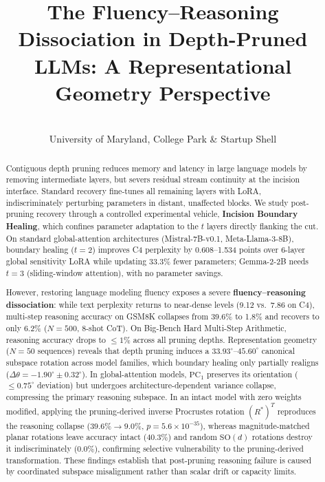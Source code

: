 \documentclass[pmlr,onecolumn]{jmlr}
\title[The Fluency--Reasoning Dissociation in Depth-Pruned LLMs]{The Fluency--Reasoning Dissociation in Depth-Pruned LLMs: A Representational Geometry Perspective}
\author[Kapoor]{\Name{Saksham Kapoor} \Email{sakshamk@terpmail.umd.edu}\\
\addr University of Maryland, College Park \& Startup Shell}
\begin{document}
\raggedbottom

\maketitle

\begin{abstract}
Contiguous depth pruning reduces memory and latency in large language models by removing intermediate layers, but severs residual stream continuity at the incision interface. Standard recovery fine-tunes all remaining layers with LoRA, indiscriminately perturbing parameters in distant, unaffected blocks. We study post-pruning recovery through a controlled experimental vehicle, \textbf{Incision Boundary Healing}, which confines parameter adaptation to the $t$ layers directly flanking the cut. On standard global-attention architectures (Mistral-7B-v0.1, Meta-Llama-3-8B), boundary healing ($t=2$) improves C4 perplexity by 0.608--1.534 points over 6-layer global sensitivity LoRA while updating 33.3\% fewer parameters; Gemma-2-2B needs $t=3$ (sliding-window attention), with no parameter savings.

However, restoring language modeling fluency exposes a severe \textbf{fluency--reasoning dissociation}: while text perplexity returns to near-dense levels (9.12 vs.\ 7.86 on C4), multi-step reasoning accuracy on GSM8K collapses from 39.6\% to 1.8\% and recovers to only 6.2\% ($N=500$, 8-shot CoT). On Big-Bench Hard Multi-Step Arithmetic, reasoning accuracy drops to $\le 1\%$ across all pruning depths. Representation geometry ($N=50$ sequences) reveals that depth pruning induces a $33.93^\circ$--$45.60^\circ$ canonical subspace rotation across model families, which boundary healing only partially realigns ($\Delta\theta = -1.90^\circ \pm 0.32^\circ$). In global-attention models, $\mathrm{PC}_1$ preserves its orientation ($\le 0.75^\circ$ deviation) but undergoes architecture-dependent variance collapse, compressing the primary reasoning subspace. In an intact model with zero weights modified, applying the pruning-derived inverse Procrustes rotation $(R^*)^T$ reproduces the reasoning collapse ($39.6\% \to 9.0\%$, $p = 5.6 \times 10^{-35}$), whereas magnitude-matched planar rotations leave accuracy intact ($40.3\%$) and random $\text{SO}(d)$ rotations destroy it indiscriminately ($0.0\%$), confirming selective vulnerability to the pruning-derived transformation. These findings establish that post-pruning reasoning failure is caused by coordinated subspace misalignment rather than scalar drift or capacity limits.
\end{abstract}
\end{document}

